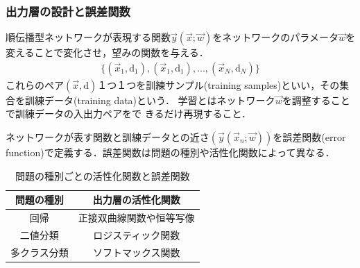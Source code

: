 \documentclass[dvipdfmx,11pt,notheorems]{beamer}
\theoremstyle{definition}
\begin{document}
\begin{frame}[fragile]\frametitle{出力層の設計と誤差関数}

順伝播型ネットワークが表現する関数$\vec{y}(\vec{x};\vec{w})$をネットワークのパラメータ$\vec{w}$を変えることで変化させ，望みの関数を与える．
\begin{eqnarray}
 \{(\vec{x}_{1},\mathrm{d}_{1}),(\vec{x}_{1},\mathrm{d}_{1}),...,(\vec{x}_{N},\mathrm{d}_{N})\}
\end{eqnarray}
これらのペア$(\vec{x},\mathrm{d})$１つ１つを訓練サンプル(training samples)といい，その集合を訓練データ(training data)という．
学習とはネットワーク$\vec{w}$を調整することで訓練データの入出力ペアをで
 きるだけ再現すること．

ネットワークが表す関数と訓練データとの近さ$(\vec{y}(\vec{x}_{n};\vec{w}))$を誤差関数(error function)で定義する．誤差関数は問題の種別や活性化関数によって異なる．

\begin{table}[htb]
\centering
\caption{問題の種別ごとの活性化関数と誤差関数}
\label{000718_27Jun15}
\begin{tabular}[bt]{|c|c|}\hline
 問題の種別 & 出力層の活性化関数 \\ \hline \hline
 回帰 & 正接双曲線関数や恒等写像\\
 二値分類 & ロジスティック関数\\
 多クラス分類 & ソフトマックス関数\\ \hline
\end{tabular}
\end{table}
\end{frame}
\end{document}
